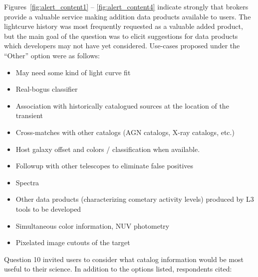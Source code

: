 \documentclass{article}
\begin{document}
Figures~\ref{fig:alert_content1} -- \ref{fig:alert_content4} indicate strongly that brokers provide a valuable service making addition data products available to users.  The lightcurve history was most frequently requested as a valuable added product, but the main goal of the question was to elicit suggestions for data products which developers may not have yet considered.  Use-cases proposed under the ``Other'' option were as follows:

\begin{itemize}
\item May need some kind of light curve fit
\item Real-bogus classifier
\item Association with historically catalogued sources at the location of the transient
\item Cross-matches with other catalogs (AGN catalogs, X-ray catalogs, etc.)
\item Host galaxy offset and colors / classification when available.
\item Followup with other telescopes to eliminate false positives
\item Spectra
\item Other data products (characterizing cometary activity levels) produced by L3 tools to be developed
\item Simultaneous color information, NUV photometry  
\item Pixelated image cutouts of the target
\end{itemize}

Question 10 invited users to consider what catalog information would be most useful to their science.  In addition to the options listed, respondents cited:
\end{document}
